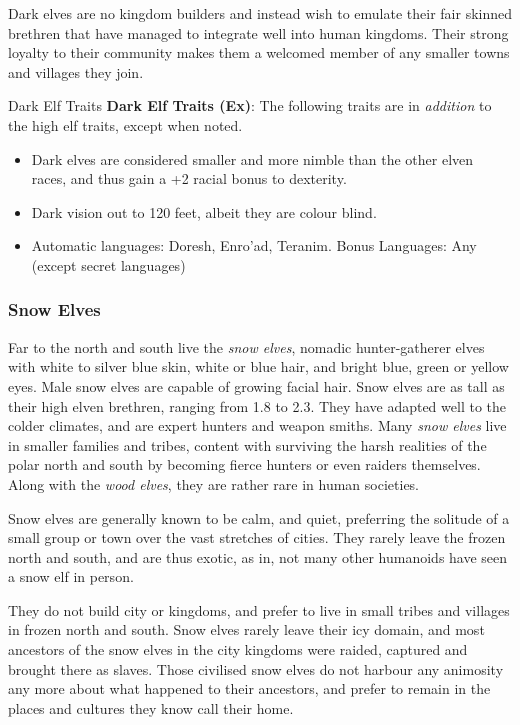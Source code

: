 Dark elves are no kingdom builders and instead wish to emulate their fair
skinned brethren that have managed to integrate well into human kingdoms. Their
strong loyalty to their community makes them a welcomed member of any smaller
towns and villages they join.

\begin{35e}{Dark Elf Traits}
  \textbf{Dark Elf Traits (Ex)}: The following traits are in \emph{addition}
  to the high elf traits, except when noted.
  \begin{itemize}[noitemsep]
    \item Dark elves are considered smaller and more nimble than the other
      elven races, and thus gain a +2 racial bonus to dexterity.
    \item Dark vision out to 120 feet, albeit they are colour blind.
    \item Automatic languages: Doresh, Enro'ad, Teranim. Bonus Languages: Any
      (except secret languages)
  \end{itemize}
\end{35e}

\subsubsection*{Snow Elves}
\label{sec:Snow Elves}


Far to the north and south live the \emph{snow elves}, nomadic hunter-gatherer
elves with white to silver blue skin, white or blue hair, and bright blue,
green or yellow eyes. Male snow elves are capable of growing facial hair. Snow
elves are as tall as their high elven brethren, ranging from 1.8 to 2.3. They
have adapted well to the colder climates, and are expert hunters and weapon
smiths. Many \emph{snow elves} live in smaller families and tribes, content
with surviving the harsh realities of the polar north and south by becoming
fierce hunters or even raiders themselves. Along with the
\emph{wood elves}, they are rather rare in human societies.

Snow elves are generally known to be calm, and quiet, preferring the solitude
of a small group or town over the vast stretches of cities. They rarely leave
the frozen north and south, and are thus exotic, as in, not many other
humanoids have seen a snow elf in person.

They do not build city or kingdoms, and prefer to live in small tribes and
villages in frozen north and south. Snow elves rarely leave their icy domain,
and most ancestors of the snow elves in the city kingdoms were raided,
captured and brought there as slaves. Those civilised snow elves do not
harbour any animosity any more about what happened to their ancestors, and
prefer to remain in the places and cultures they know call their home.

